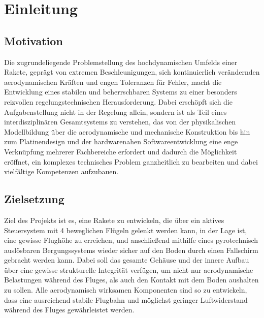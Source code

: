 
\clearpage
\thispagestyle{fancy}
\setcounter{page}{1} %

\fancyfoot[C]{}
\part{Einleitung}
\label{part:introduction}
\chapter{Motivation}
Die zugrundeliegende Problemstellung des hochdynamischen Umfelds einer Rakete, geprägt von extremen Beschleunigungen, sich kontinuierlich verändernden aerodynamischen Kräften und engen Toleranzen für Fehler, macht die Entwicklung eines stabilen und beherrschbaren Systems zu einer besonders reizvollen regelungstechnischen Herausforderung.
Dabei erschöpft sich die Aufgabenstellung nicht in der Regelung allein, sondern ist als Teil eines interdisziplinären Gesamtsystems zu verstehen, das von der physikalischen Modellbildung über die aerodynamische und mechanische Konstruktion bis hin zum Platinendesign und der hardwarenahen Softwareentwicklung eine enge Verknüpfung mehrerer Fachbereiche erfordert und dadurch die Möglichkeit eröffnet, ein komplexes technisches Problem ganzheitlich zu bearbeiten und dabei vielfältige Kompetenzen aufzubauen.

\chapter{Zielsetzung}
Ziel des Projekts ist es, eine Rakete zu entwickeln, die über ein aktives Steuersystem mit 4 beweglichen Flügeln gelenkt werden kann, in der Lage ist, eine gewisse Flughöhe zu erreichen, und anschließend mithilfe eines pyrotechnisch auslösbaren Bergungssystems wieder sicher auf den Boden durch einen Fallschirm gebracht werden kann. Dabei soll das gesamte Gehäuse und der innere Aufbau über eine gewisse strukturelle Integrität verfügen, um nicht nur aerodynamische Belastungen während des Fluges, als auch den Kontakt mit dem Boden aushalten zu sollen. Alle aerodynamisch wirksamen Komponenten sind so zu entwickeln, dass eine ausreichend stabile Flugbahn und möglichst geringer Luftwiderstand während des Fluges gewährleistet werden.


